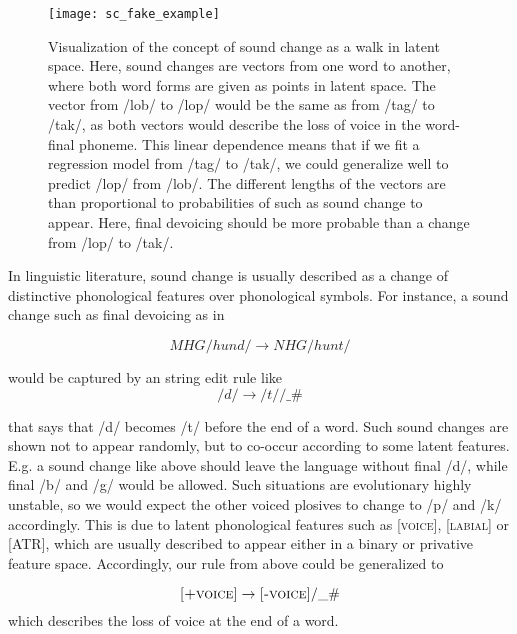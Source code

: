 \documentclass[6pt]{article}
\begin{document}
\begin{figure}[h]
\begin{center}
\texttt{[image: sc\_fake\_example]} 
\caption{Visualization of the concept of sound change as a walk in latent space. Here, sound changes are vectors from one word to another, where both word forms are given as points in latent space. The vector from /lob/ to /lop/ would be the same as from /tag/ to /tak/, as both vectors would describe the loss of voice in the word-final phoneme. This linear dependence means that if we fit a regression model from /tag/ to /tak/, we could generalize well to predict /lop/ from /lob/. The different lengths of the vectors are than proportional to probabilities of such as sound change to appear. Here, final devoicing should be more probable than a change from /lop/ to /tak/. }
\label{default}
\end{center}
\end{figure}
In linguistic literature, sound change is usually described as a change of distinctive phonological features over phonological symbols. For instance, a sound change such as final devoicing as in 

\begin{equation}
MHG /hund/ \rightarrow NHG /hunt/
\end{equation}

 would be captured by an string edit rule like
\begin{equation}
/d/ \rightarrow /t/ / \_ \#
\end{equation}

that says that /d/ becomes /t/ before the end of a word. Such sound changes are shown not to appear randomly, but to co-occur according to some latent features. E.g. a sound change like above should leave the language without final /d/, while final /b/ and /g/ would be allowed. Such situations are evolutionary highly unstable, so we would expect the other voiced plosives to change to /p/ and /k/ accordingly. This is due to latent phonological features such as \textsc{[voice]}, \textsc{[labial]} or \textsc{[ATR]}, which are usually described to appear either in a binary or privative feature space. Accordingly, our rule from above could be generalized to

\begin{equation}
\textsc{[+voice]} \rightarrow \textsc{[-voice]} / \_ \#
\label{eq:final_devoicing}
\end{equation}
which describes the loss of voice at the end of a word. 
\end{document}
